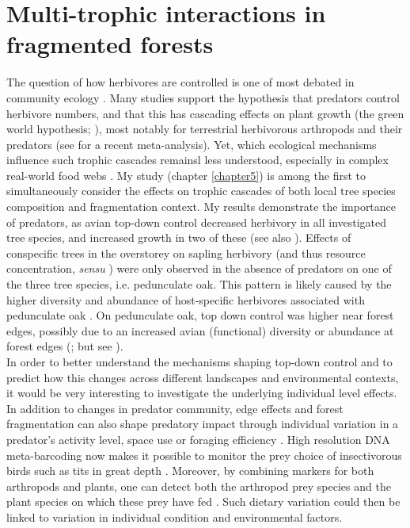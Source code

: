\documentclass[10pt, twoside]{book} %
\begin{document}
	\section{Multi-trophic interactions in fragmented forests}
	
The question of how herbivores are controlled is one of most debated in community ecology \citep{Pace1999, Schmitz2000, Borer2005}. Many studies support the hypothesis that predators control herbivore numbers, and that this has cascading effects on plant growth (the green world hypothesis; \citealt{Hairston1960}), most notably for terrestrial herbivorous arthropods and their predators (see \citealt{Vidal2018} for a recent meta-analysis). Yet, which ecological mechanisms influence such trophic cascades remainsl less understood, especially in complex real-world food webs \citep{Schmitz2000, Mantyla2011, Vidal2018}. My study (chapter \ref{chapter5}) is among the first to simultaneously consider the effects on trophic cascades of both local tree species composition and fragmentation context. My results demonstrate the importance of predators, as avian top-down control decreased herbivory in all investigated tree species, and increased growth in two of these (see also \citealt{Mantyla2011}). Effects of conspecific trees in the overstorey on sapling herbivory (and thus resource concentration, \textit{sensu} \citealt{Root1973}) were only observed in the absence of predators on one of the three tree species, i.e. pedunculate oak. This pattern is likely caused by the higher diversity and abundance of host-specific herbivores associated with pedunculate oak \citep{Kennedy1984}. On pedunculate oak, top down control was higher near forest edges, possibly due to an increased avian (functional) diversity or abundance at forest edges (\citealt{Barbaro2014, Terraube2016}; but see \citealt{Chan2020}).\\

In order to better understand the mechanisms shaping top-down control and to predict how this changes across different landscapes and environmental contexts, it would be very interesting to investigate the underlying individual level effects. In addition to changes in predator community, edge effects and forest fragmentation can also shape predatory impact through individual variation in a predator's activity level, space use or foraging efficiency \citep{Naef-Daenzer2000, Bueno-Enciso2016, Jarrett2020}. High resolution DNA meta-barcoding now makes it possible to monitor the prey choice of insectivorous birds such as tits in great depth \citep{Jedlicka2017, Rytkonen2019, Jarrett2020, Shutt2020}. Moreover, by combining markers for both arthropods and plants, one can detect both the arthropod prey species and the plant species on which these prey have fed \citep{Silva2019}. Such dietary variation could then be linked to variation in individual condition and environmental factors.\\
\end{document}
